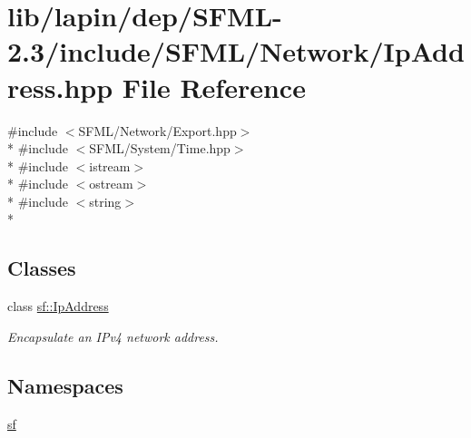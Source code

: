 \hypertarget{lapin_2dep_2_s_f_m_l-2_83_2include_2_s_f_m_l_2_network_2_ip_address_8hpp}{\section{lib/lapin/dep/\-S\-F\-M\-L-\/2.3/include/\-S\-F\-M\-L/\-Network/\-Ip\-Address.hpp File Reference}
\label{lapin_2dep_2_s_f_m_l-2_83_2include_2_s_f_m_l_2_network_2_ip_address_8hpp}
}
{\ttfamily \#include $<$S\-F\-M\-L/\-Network/\-Export.\-hpp$>$}\\*
{\ttfamily \#include $<$S\-F\-M\-L/\-System/\-Time.\-hpp$>$}\\*
{\ttfamily \#include $<$istream$>$}\\*
{\ttfamily \#include $<$ostream$>$}\\*
{\ttfamily \#include $<$string$>$}\\*
\subsection*{Classes}
\begin{DoxyCompactItemize}
\item 
class \hyperlink{classsf_1_1_ip_address}{sf\-::\-Ip\-Address}
\begin{DoxyCompactList}\small\item\em Encapsulate an I\-Pv4 network address. \end{DoxyCompactList}\end{DoxyCompactItemize}
\subsection*{Namespaces}
\begin{DoxyCompactItemize}
\item 
\hyperlink{namespacesf}{sf}
\end{DoxyCompactItemize}

